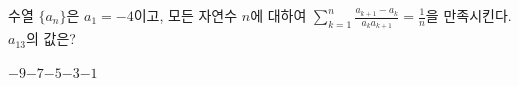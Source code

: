 수열 $\{a_n\}$은 $a_1=-4$이고, 모든 자연수 $n$에 대하여 $\displaystyle\sum_{k=1}^{n}\frac{a_{k+1}-a_k}{a_ka_{k+1}}=\frac{1}{n}$을 만족시킨다. $a_{13}$의 값은?
\begin{choices32}{$-9$}{$-7$}{$-5$}{$-3$}{$-1$}\end{choices32}
